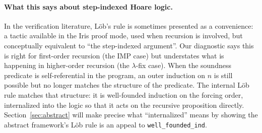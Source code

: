 \paragraph{What this says about step-indexed Hoare logic.}
In the verification literature, Löb's rule is sometimes presented as
a convenience: a tactic available in the Iris proof mode, used when
recursion is involved, but conceptually equivalent to ``the
step-indexed argument''.  Our diagnostic says this is right for
first-order recursion (the IMP case) but understates what is
happening in higher-order recursion (the $\lambda$-fix case).  When
the soundness predicate is self-referential in the
program, an outer induction on $n$ is still possible but no longer
matches the structure of the predicate.  The internal Löb rule
matches that structure: it is well-founded induction on the forcing
order, internalized into the logic so that it acts on the recursive
proposition directly.
Section~\ref{sec:abstract} will make precise what
``internalized'' means by showing the abstract framework's Löb
rule is an appeal to \texttt{well\_founded\_ind}.


